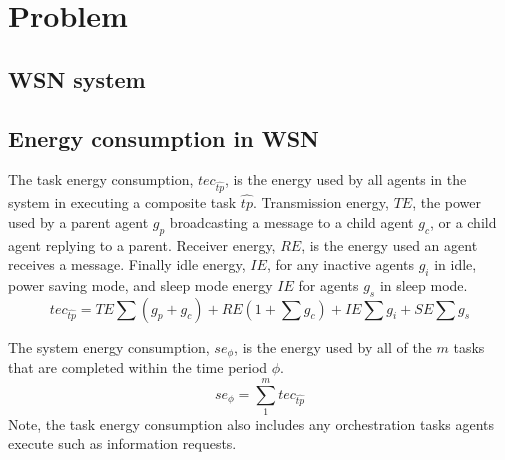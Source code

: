 \section{Problem}
\label{section:problem}
    
\newcommand{\varTime}[2]{\phi}
\newcommand{\varAtomicTask}[2]{tp}
\newcommand{\varCompositeTask}[2]{\hat{tp}}
\newcommand{\varAgent}[2]{g_{#1}^{#2}}
\newcommand{\varIdleAgent}[2]{\varAgent{i}{}}  
\newcommand{\varSleepAgent}[2]{\varAgent{s}{}}  
\newcommand{\varChildAgent}[2]{\varAgent{c}{}}    
\newcommand{\varParentAgent}[2]{\varAgent{p}{}}

\newcommand{\varOrchestrationEnergy}[2]{OE}
\newcommand{\varTransmissionEnergy}[2]{TE}
\newcommand{\varReceiverEnergy}[2]{RE}
\newcommand{\varIdleEnergy}[2]{IE}
\newcommand{\varSleepEnergy}[2]{SE}
\newcommand{\varSystemEnergy}[2]{se_{\varTime{}{}}}
\newcommand{\varTaskEnergy}[2]{tec_{\varCompositeTask{}{}}}

\subsection{WSN system}

\subsection{Energy consumption in WSN}

\begin{definition}
	The task energy consumption, $\varTaskEnergy{}{}$, is the energy used by all agents in the system in executing a composite task $\varCompositeTask{}{}$. Transmission energy, $\varTransmissionEnergy{}{}$, the power used by a parent agent $\varParentAgent{}{}$ broadcasting a message to a child agent $\varChildAgent{}{}$, or a child agent replying to a parent. Receiver energy, $\varReceiverEnergy{}{}$, is the energy used an agent receives a message. Finally idle energy, $\varIdleEnergy{}{}$, for any inactive agents $\varIdleAgent{}{}$ in idle, power saving mode, and sleep mode energy $\varIdleEnergy{}{}$ for agents $\varSleepAgent{}{}$ in sleep mode.
   	\begin{equation}
   		\varTaskEnergy{}{} 
   		= \varTransmissionEnergy{}{} \sum (\varParentAgent{}{} + \varChildAgent{}{})
   		+ \varReceiverEnergy{}{} (1 + \sum \varChildAgent{}{})
   		+ \varIdleEnergy{}{} \sum \varIdleAgent{}{}
   		+ \varSleepEnergy{}{} \sum \varSleepAgent{}{}
   	\end{equation}
\end{definition}
\begin{definition}
	The system energy consumption, $\varSystemEnergy{}{}$, is the energy used by all of the $m$ tasks that are completed within the time period $\varTime{}{}$.
	\begin{equation}
		\varSystemEnergy{}{} 
		= \sum_{1}^{m} \varTaskEnergy{}{}
	\end{equation}
	Note, the task energy consumption also includes any orchestration tasks agents execute such as information requests.
\end{definition}

